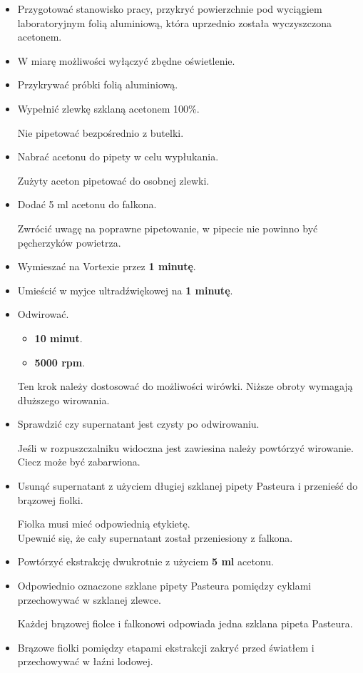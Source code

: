 \documentclass[
  letterpaper,
  DIV=11,
  numbers=noendperiod]{scrreprt}
\begin{document}
\begin{itemize}
\item
  Przygotować stanowisko pracy, przykryć powierzchnie pod wyciągiem
  laboratoryjnym folią aluminiową, która uprzednio została wyczyszczona
  acetonem.
\item
  W miarę możliwości wyłączyć zbędne oświetlenie.
\item
  Przykrywać próbki folią aluminiową.
\item
  Wypełnić zlewkę szklaną acetonem 100\%.

  Nie pipetować bezpośrednio z butelki.
\item
  Nabrać acetonu do pipety w celu wypłukania.

  Zużyty aceton pipetować do osobnej zlewki.
\item
  Dodać 5 ml acetonu do falkona.

  Zwrócić uwagę na poprawne pipetowanie, w pipecie nie powinno być
  pęcherzyków powietrza.
\item
  Wymieszać na Vortexie przez \textbf{1 minutę}.
\item
  Umieścić w myjce ultradźwiękowej na \textbf{1 minutę}.
\item
  Odwirować.

  \begin{itemize}
  \item
    \textbf{10 minut}.
  \item
    \textbf{5000 rpm}.
  \end{itemize}

  Ten krok należy dostosować do możliwości wirówki. Niższe obroty
  wymagają dłuższego wirowania.
\item
  Sprawdzić czy supernatant jest czysty po odwirowaniu.

  Jeśli w rozpuszczalniku widoczna jest zawiesina należy powtórzyć
  wirowanie. Ciecz może być zabarwiona.
\item
  Usunąć supernatant z użyciem długiej szklanej pipety Pasteura i
  przenieść do brązowej fiolki.

  Fiolka musi mieć odpowiednią etykietę.\\
  Upewnić się, że cały supernatant został przeniesiony z falkona.
\item
  Powtórzyć ekstrakcję dwukrotnie z użyciem \textbf{5 ml} acetonu.
\item
  Odpowiednio oznaczone szklane pipety Pasteura pomiędzy cyklami
  przechowywać w szklanej zlewce.

  Każdej brązowej fiolce i falkonowi odpowiada jedna szklana pipeta
  Pasteura.
\item
  Brązowe fiolki pomiędzy etapami ekstrakcji zakryć przed światłem i
  przechowywać w łaźni lodowej.


\end{itemize}
\end{document}
